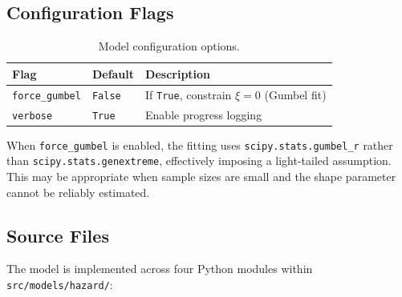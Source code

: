 \documentclass[11pt,a4paper]{article}
\begin{document}
\subsection{Configuration Flags}

\begin{table}[H]
\centering
\caption{Model configuration options.}
\label{tab:config_flags}
\begin{tabular}{lll}
\toprule
\textbf{Flag} & \textbf{Default} & \textbf{Description} \\
\midrule
\texttt{force\_gumbel} & \texttt{False} & If \texttt{True}, constrain $\xi = 0$ (Gumbel fit) \\
\texttt{verbose}       & \texttt{True}  & Enable progress logging \\
\bottomrule
\end{tabular}
\end{table}

\noindent When \texttt{force\_gumbel} is enabled, the fitting uses \texttt{scipy.stats.gumbel\_r} rather than \texttt{scipy.stats.genextreme}, effectively imposing a light-tailed assumption. This may be appropriate when sample sizes are small and the shape parameter cannot be reliably estimated.

\clearpage

\mkmimplementation

\subsection{Source Files}

The model is implemented across four Python modules within \texttt{src/models/hazard/}:
\end{document}
